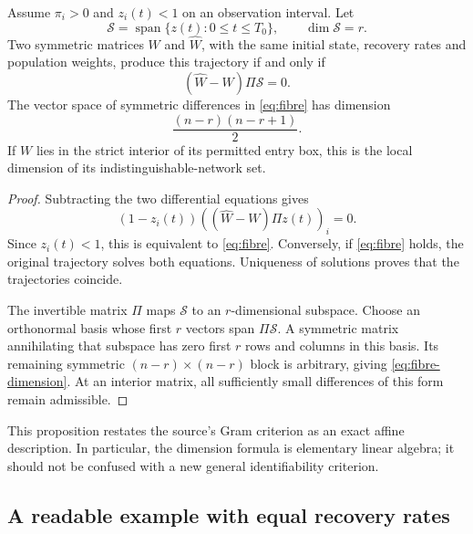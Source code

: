 \begin{proposition}
\label{prop:fibre}
Assume $\pi_i>0$ and $z_i(t)<1$ on an observation interval. Let
\[
 \mathcal S=\operatorname{span}\{z(t):0\leq t\leq T_0\},
 \qquad \dim\mathcal S=r.
\]
Two symmetric matrices $W$ and $\widehat W$, with the same initial state, recovery rates and population weights, produce this trajectory if and only if
\begin{equation}
 (\widehat W-W)\Pi\mathcal S=0.
 \label{eq:fibre}
\end{equation}
The vector space of symmetric differences in \eqref{eq:fibre} has dimension
\begin{equation}
 \frac{(n-r)(n-r+1)}2.
 \label{eq:fibre-dimension}
\end{equation}
If $W$ lies in the strict interior of its permitted entry box, this is the local dimension of its indistinguishable-network set.
\end{proposition}

\begin{proof}
Subtracting the two differential equations gives
\[
 (1-z_i(t))((\widehat W-W)\Pi z(t))_i=0.
\]
Since $z_i(t)<1$, this is equivalent to \eqref{eq:fibre}. Conversely, if \eqref{eq:fibre} holds, the original trajectory solves both equations. Uniqueness of solutions proves that the trajectories coincide.

The invertible matrix $\Pi$ maps $\mathcal S$ to an $r$-dimensional subspace. Choose an orthonormal basis whose first $r$ vectors span $\Pi\mathcal S$. A symmetric matrix annihilating that subspace has zero first $r$ rows and columns in this basis. Its remaining symmetric $(n-r)\times(n-r)$ block is arbitrary, giving \eqref{eq:fibre-dimension}. At an interior matrix, all sufficiently small differences of this form remain admissible.
\end{proof}

This proposition restates the source's Gram criterion as an exact affine description. In particular, the dimension formula is elementary linear algebra; it should not be confused with a new general identifiability criterion.

\subsection{A readable example with equal recovery rates}

